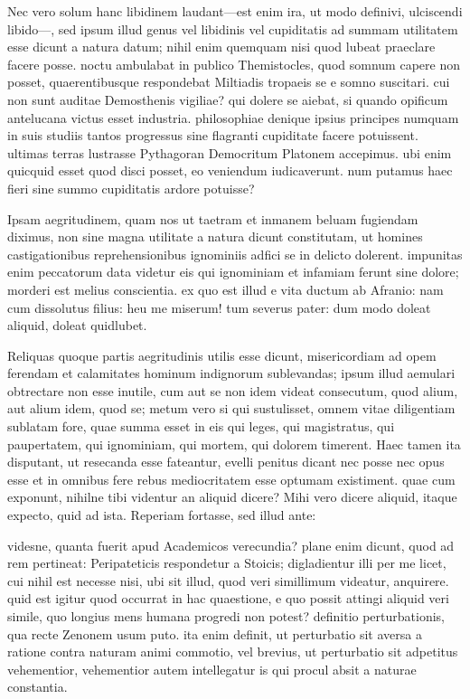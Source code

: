  Nec vero solum hanc libidinem laudant—est enim ira, ut modo definivi, ulciscendi libido—, sed ipsum illud genus vel libidinis vel cupiditatis ad summam utilitatem esse dicunt a natura datum; nihil enim quemquam nisi quod lubeat praeclare facere posse. noctu ambulabat in publico Themistocles, quod somnum capere non posset, quaerentibusque respondebat Miltiadis tropaeis se e somno suscitari. cui non sunt auditae Demosthenis vigiliae? qui dolere se aiebat, si quando opificum antelucana victus esset industria. philosophiae denique ipsius principes numquam in suis studiis tantos progressus sine flagranti cupiditate facere potuissent. ultimas terras lustrasse Pythagoran Democritum Platonem accepimus. ubi enim quicquid esset quod disci posset, eo veniendum iudicaverunt. num putamus haec fieri sine summo cupiditatis ardore potuisse?

 Ipsam aegritudinem, quam nos ut taetram et inmanem beluam fugiendam diximus, non sine magna utilitate a natura dicunt constitutam, ut homines castigationibus reprehensionibus ignominiis adfici se in delicto dolerent. impunitas enim peccatorum data videtur eis qui ignominiam et infamiam ferunt sine dolore; morderi est melius conscientia. ex quo est illud e vita ductum ab Afranio: nam cum dissolutus filius: heu me miserum! tum severus pater: dum modo doleat aliquid, doleat quidlubet.

 Reliquas quoque partis aegritudinis utilis esse dicunt, misericordiam ad opem ferendam et calamitates hominum indignorum sublevandas; ipsum illud aemulari obtrectare non esse inutile, cum aut se non idem videat consecutum, quod alium, aut alium idem, quod se; metum vero si qui sustulisset, omnem vitae diligentiam sublatam fore, quae summa esset in eis qui leges, qui magistratus, qui paupertatem, qui ignominiam, qui mortem, qui dolorem timerent. Haec tamen ita disputant, ut resecanda esse fateantur, evelli penitus dicant nec posse nec opus esse et in omnibus fere rebus mediocritatem esse optumam existiment. quae cum exponunt, nihilne tibi videntur an aliquid dicere? Mihi vero dicere aliquid, itaque expecto, quid ad ista. Reperiam fortasse, sed illud ante:

 videsne, quanta fuerit apud Academicos verecundia? plane enim dicunt, quod ad rem pertineat: Peripateticis respondetur a Stoicis; digladientur illi per me licet, cui nihil est necesse nisi, ubi sit illud, quod veri simillimum videatur, anquirere. quid est igitur quod occurrat in hac quaestione, e quo possit attingi aliquid veri simile, quo longius mens humana progredi non potest? definitio perturbationis, qua recte Zenonem usum puto. ita enim definit, ut perturbatio sit aversa a ratione contra naturam animi commotio, vel brevius, ut perturbatio sit adpetitus vehementior, vehementior autem intellegatur is qui procul absit a naturae constantia.

